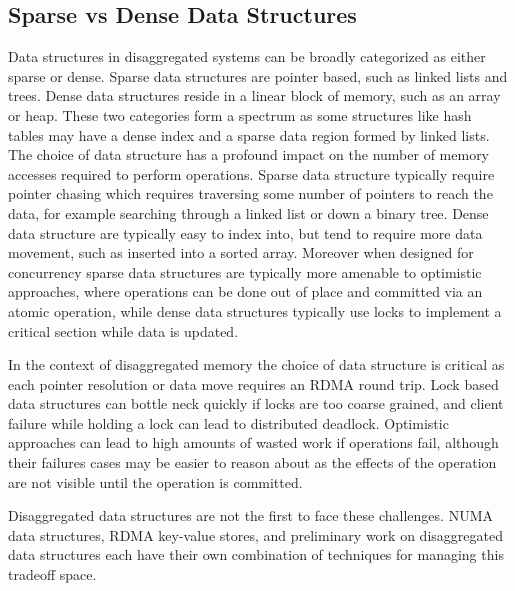 \documentclass[12pt]{ucsddissertation}
\begin{document}
\subsection{Sparse vs Dense Data Structures}
\label{sec:sparse-dense}
Data structures in disaggregated systems can be broadly categorized as either sparse or dense.
Sparse data structures are pointer based, such as linked lists and trees. Dense data structures
reside in a linear block of memory, such as an array or heap. These two categories form a spectrum
as some structures like hash tables may have a dense index and a sparse data region formed by linked
lists. The choice of data structure has a profound impact on the number of memory accesses required
to perform operations. Sparse data structure typically require pointer chasing which requires
traversing some number of pointers to reach the data, for example searching through a linked list or
down a binary tree. Dense data structure are typically easy to index into, but tend to require more
data movement, such as inserted into a sorted array. Moreover when designed for concurrency sparse
data structures are typically more amenable to optimistic approaches, where operations can be done
out of place and committed via an atomic operation, while dense data structures typically use locks
to implement a critical section while data is updated.

In the context of disaggregated memory the choice of data structure is critical as each pointer
resolution or data move requires an RDMA round trip. Lock based data structures can bottle neck
quickly if locks are too coarse grained, and client failure while holding a lock can lead to
distributed deadlock. Optimistic approaches can lead to high amounts of wasted work if operations
fail, although their failures cases may be easier to reason about as the effects of the operation
are not visible until the operation is committed.

Disaggregated data structures are not the first to face these challenges. NUMA data structures, RDMA
key-value stores, and preliminary work on disaggregated data structures each have their own
combination of techniques for managing this tradeoff space.
\end{document}
